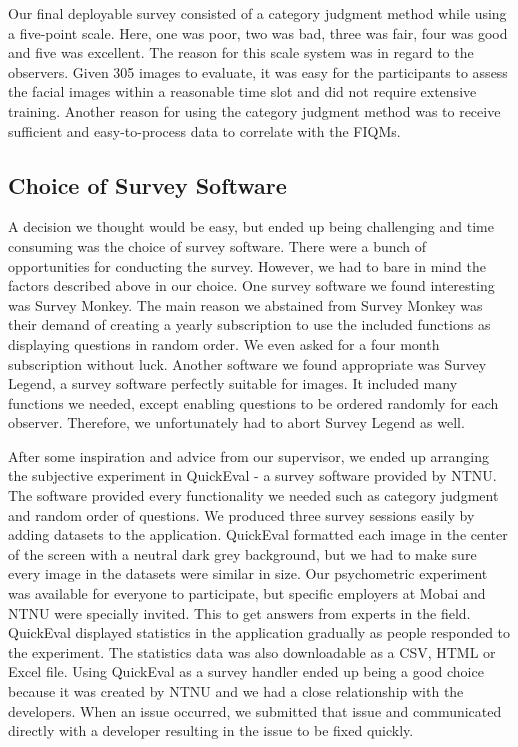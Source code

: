 Our final deployable survey consisted of a category judgment method while using a five-point scale. Here, one was poor, two was bad, three was fair, four was good and five was excellent. The reason for this scale system was in regard to the observers. Given 305 images to evaluate, it was easy for the participants to assess the facial images within a reasonable time slot and did not require extensive training. Another reason for using the category judgment method was to receive sufficient and easy-to-process data to correlate with the FIQMs.

\subsection*{Choice of Survey Software}
\label{subsection:choicesoftware}
A decision we thought would be easy, but ended up being challenging and time consuming was the choice of survey software. There were a bunch of opportunities for conducting the survey. However, we had to bare in mind the factors described above in our choice. One survey software we found interesting was Survey Monkey. The main reason we abstained from Survey Monkey was their demand of creating a yearly subscription to use the included functions as displaying questions in random order. We even asked for a four month subscription without luck. Another software we found appropriate was Survey Legend, a survey software perfectly suitable for images. It included many functions we needed, except enabling questions to be ordered randomly for each observer. Therefore, we unfortunately had to abort Survey Legend as well. 

After some inspiration and advice from our supervisor, we ended up arranging the subjective experiment in QuickEval - a survey software provided by NTNU. The software provided every functionality we needed such as category judgment and random order of questions. We produced three survey sessions easily by adding datasets to the application. QuickEval formatted each image in the center of the screen with a neutral dark grey background, but we had to make sure every image in the datasets were similar in size. Our psychometric experiment was available for everyone to participate, but specific employers at Mobai and NTNU were specially invited. This to get answers from experts in the field. QuickEval displayed statistics in the application gradually as people responded to the experiment. The statistics data was also downloadable as a CSV, HTML or Excel file. 
Using QuickEval as a survey handler ended up being a good choice because it was created by NTNU and we had a close relationship with the developers. When an issue occurred, we submitted that issue and communicated directly with a developer resulting in the issue to be fixed quickly. 

